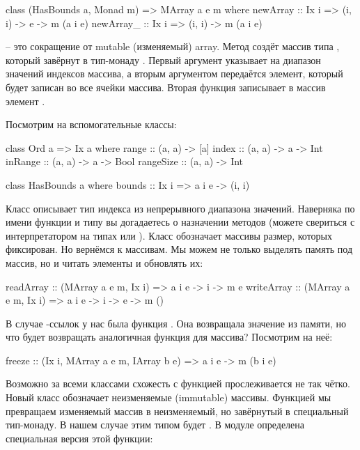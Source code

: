 \begin{code}
class (HasBounds a, Monad m) => MArray a e m where
    newArray  :: Ix i => (i, i) -> e -> m (a i e)
    newArray_ :: Ix i => (i, i) -> m (a i e)
\end{code}

 -- это сокращение от mutable (изменяемый) array. Метод
 создёт массив типа , который завёрнут в тип-монаду
. Первый аргумент указывает на диапазон значений индексов массива,
а вторым аргументом передаётся элемент, который будет записан во все
ячейки массива. Вторая функция записывает в массив элемент
.

Посмотрим на вспомогательные классы:


\begin{code}
class Ord a => Ix a where
    range :: (a, a) -> [a]
    index :: (a, a) -> a -> Int
    inRange :: (a, a) -> a -> Bool
    rangeSize :: (a, a) -> Int

class HasBounds a where
    bounds :: Ix i => a i e -> (i, i)
\end{code}

Класс  описывает тип индекса из непрерывного диапазона значений.
Наверняка по имени функции и типу вы догадаетесь о назначении методов
(можете свериться с интерпретатором на типах  или
). Класс  обозначает массивы размер,
которых фиксирован. Но вернёмся к массивам. Мы можем не только выделять
память под массив, но и читать элементы и обновлять их:


\begin{code}
readArray  :: (MArray a e m, Ix i) => a i e -> i -> m e
writeArray :: (MArray a e m, Ix i) => a i e -> i -> e -> m ()
\end{code}

В случае -ссылок у нас была функция . Она возвращала
значение из памяти, но что будет возвращать аналогичная функция для
массива? Посмотрим на неё:


\begin{code}
freeze :: (Ix i, MArray a e m, IArray b e) => a i e -> m (b i e)
\end{code}

Возможно за всеми классами схожесть с функцией  прослеживается
не так чётко. Новый класс  обозначает неизменяемые
(immutable) массивы. Функцией  мы превращаем изменяемый
массив в неизменяемый, но завёрнутый в специальный тип-монаду. В нашем
случае этим типом будет . В модуле  определена
специальная версия этой функции:


